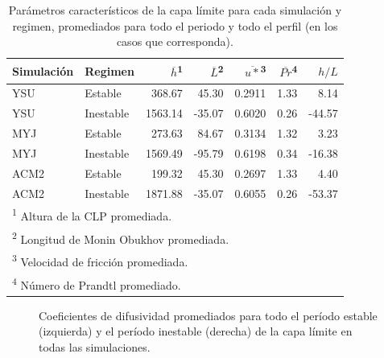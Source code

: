 \documentclass[12pt,spanish,oneside]{book}
\begin{document}
\begin{table}

\caption{\label{tab:tabla-clp}Parámetros característicos de la capa límite para cada simulación y regimen, promediados para todo el periodo y todo el perfil (en los casos que corresponda).}
\centering
\begin{tabular}[t]{llrrrrr}
\toprule
Simulación & Regimen & $\overline{h}$\textsuperscript{1} & $\overline{L}$\textsuperscript{2} & $\overline{u*}$\textsuperscript{3} & $\overline{Pr}$\textsuperscript{4} & $h/L$\\
\midrule
YSU & Estable & 368.67 & 45.30 & 0.2911 & 1.33 & 8.14\\
YSU & Inestable & 1563.14 & -35.07 & 0.6020 & 0.26 & -44.57\\
MYJ & Estable & 273.63 & 84.67 & 0.3134 & 1.32 & 3.23\\
MYJ & Inestable & 1569.49 & -95.79 & 0.6198 & 0.34 & -16.38\\
ACM2 & Estable & 199.32 & 45.30 & 0.2697 & 1.33 & 4.40\\
ACM2 & Inestable & 1871.88 & -35.07 & 0.6055 & 0.26 & -53.37\\
\bottomrule
\multicolumn{7}{l}{\textsuperscript{1} Altura de la CLP promediada.}\\
\multicolumn{7}{l}{\textsuperscript{2} Longitud de Monin Obukhov promediada.}\\
\multicolumn{7}{l}{\textsuperscript{3} Velocidad de fricción promediada.}\\
\multicolumn{7}{l}{\textsuperscript{4} Número de Prandtl promediado.}\\
\end{tabular}
\end{table}

\begin{figure}

{\centering {}\newline{}

}

\caption{Coeficientes de difusividad promediados para todo el período estable (izquierda) y el período inestable (derecha) de la capa límite en todas las simulaciones. \label{kh_wrf}}\label{fig:k_ulke_wrf}
\end{figure}
\end{document}
